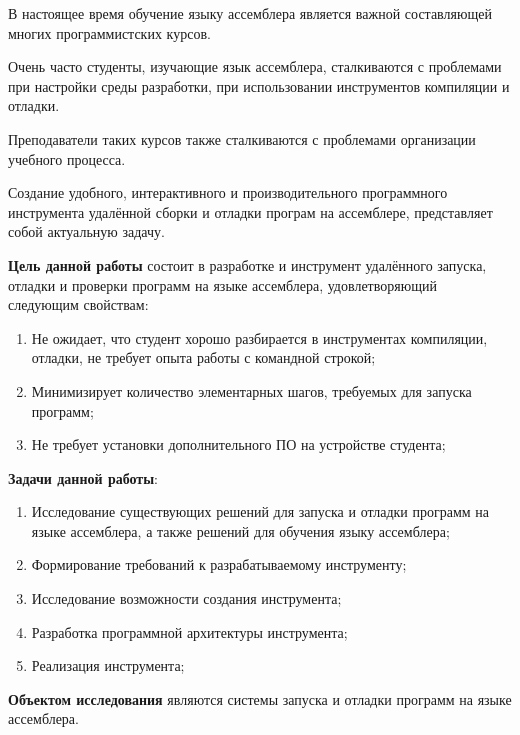 \documentclass[a4paper,article,14pt]{extarticle}
\begin{document}
%

\tableofcontents
\pagebreak


В настоящее время обучение языку ассемблера является важной составляющей многих программистских курсов.

Очень часто студенты, изучающие язык ассемблера, сталкиваются с проблемами при настройки среды разработки, при использовании инструментов компиляции и отладки.

Преподаватели таких курсов также сталкиваются с проблемами организации учебного процесса.

Создание удобного, интерактивного и производительного программного инструмента удалённой сборки и отладки програм на ассемблере, представляет собой актуальную задачу.

\textbf{Цель данной работы} состоит в разработке и инструмент удалённого запуска, отладки и проверки программ на языке ассемблера, удовлетворяющий следующим свойствам:

\begin{enumerate}
    \item Не ожидает, что студент хорошо разбирается в инструментах компиляции, отладки, не требует опыта работы с командной строкой;
    \item Минимизирует количество элементарных шагов, требуемых для запуска программ;
    \item Не требует установки дополнительного ПО на устройстве студента;
\end{enumerate}

\textbf{Задачи данной работы}:

\begin{enumerate}
    \item Исследование существующих решений для запуска и отладки программ на языке ассемблера, а также решений для обучения языку ассемблера;
    \item Формирование требований к разрабатываемому инструменту;
    \item Исследование возможности создания инструмента;
    \item Разработка программной архитектуры инструмента;
    \item Реализация инструмента;
\end{enumerate}

\textbf{Объектом исследования} являются системы запуска и отладки программ на языке ассемблера.
\end{document}
